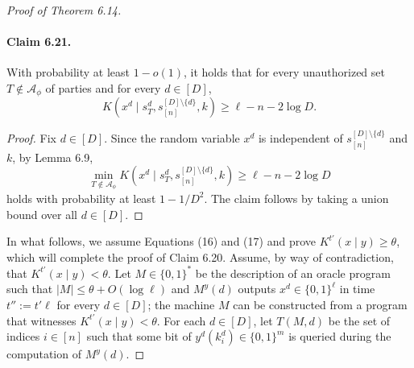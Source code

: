 \begin{proof}[Proof of Theorem 6.14]
\paragraph{Claim 6.21.}
With probability at least $1-o(1)$, it holds that for every unauthorized set $T\notin\mathcal A_\phi$ of parties and for every $d\in[D]$,
\[K(x^d\mid s_T^d,s_{[n]}^{[D]\setminus\{d\}},k)\geq\ell-n-2\log D.\tag{17}\]
\begin{proof}
Fix $d\in[D]$. Since the random variable $x^d$ is independent of $s_{[n]}^{[D]\setminus\{d\}}$ and $k$, by Lemma 6.9,
\[\min_{T\notin\mathcal A_\phi}K(x^d\mid s_T^d,s_{[n]}^{[D]\setminus\{d\}},k)\geq\ell-n-2\log D\]
holds with probability at least $1-1/D^2$. The claim follows by taking a union bound over all $d\in[D]$.
\end{proof}
In what follows, we assume Equations (16) and (17) and prove $K^{t'}(x\mid y)\geq\theta$, which will complete the proof of Claim 6.20. Assume, by way of contradiction, that $K^{t'}(x\mid y)<\theta$. Let $M\in\{0,1\}^*$ be the description of an oracle program such that $|M|\leq\theta+O(\log\ell)$ and $M^y(d)$ outputs $x^d\in\{0,1\}^\ell$ in time $t'':=t'\ell$ for every $d\in[D]$; the machine $M$ can be constructed from a program that witnesses $K^{t'}(x\mid y)<\theta$. For each $d\in[D]$, let $T(M,d)$ be the set of indices $i\in[n]$ such that some bit of $y^d(k_i^d)\in\{0,1\}^m$ is queried during the computation of $M^y(d)$.

\end{proof}
